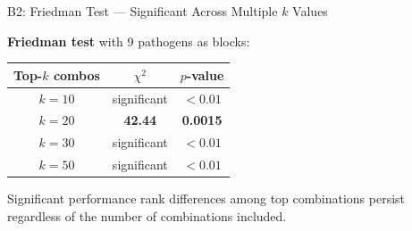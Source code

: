 \documentclass[aspectratio=169,11pt]{beamer}
\begin{document}
\begin{frame}{B2: Friedman Test --- Significant Across Multiple $k$ Values}

\textbf{Friedman test} with 9 pathogens as blocks:

\vspace{1em}
\begin{center}
\begin{tabular}{ccc}
\toprule
\textbf{Top-$k$ combos} & $\chi^2$ & $p$-value \\
\midrule
$k = 10$ & significant & $< 0.01$ \\
\rowcolor{stage2orange!12}
$k = 20$ & \textbf{42.44} & \textbf{0.0015} \\
$k = 30$ & significant & $< 0.01$ \\
$k = 50$ & significant & $< 0.01$ \\
\bottomrule
\end{tabular}
\end{center}

\vspace{1em}
Significant performance rank differences among top combinations persist regardless of the number of combinations included.
\end{frame}
\end{document}
